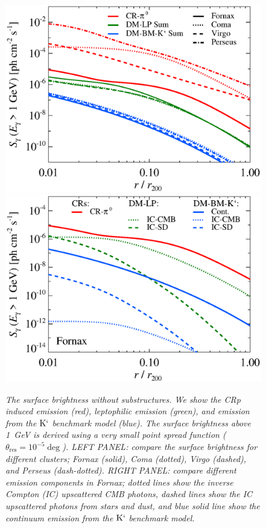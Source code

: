 \documentclass[10pt,aps,pra,reprint,amsmath,amsfonts,amssymb,showpacs]{revtex4-1}
\newcommand{\rmn}{\mathrm}
\newcommand{\psf}{\theta_\rmn{res}}
\newcommand{\Kp}{\rmn{K}`}
\begin{document}
\begin{figure}
\begin{minipage}{2.0\columnwidth}
  \includegraphics[width=0.49\columnwidth]{figures/SB.v9.1GeV.SF300.noSuB.elmu.eps}
  \includegraphics[width=0.49\columnwidth]{figures/SB.fornax.v9.1GeV.SF300.noSuB.elmu.eps}
\caption{\it The surface brightness without substructures. We show the
  CRp induced emission (red), leptophilic emission (green), and
  emission from the $\Kp$ benchmark model (blue). The surface
  brightness above 1~GeV is derived using a very small point spread
  function ($\psf=10^{-5}\deg$). LEFT PANEL: compare the
  surface brightness for different clusters; Fornax (solid), Coma
  (dotted), Virgo (dashed), and Perseus (dash-dotted). RIGHT PANEL:
  compare different emission components in Fornax; dotted lines show
  the inverse Compton (IC) upscattered CMB photons, dashed lines show
  the IC upscattered photons from stars and dust, and blue solid line
  show the continuum emission from the $\Kp$ benchmark
  model.}
 \label{fig:SB_clu_nosub}
\end{minipage}
\end{figure}
\end{document}
